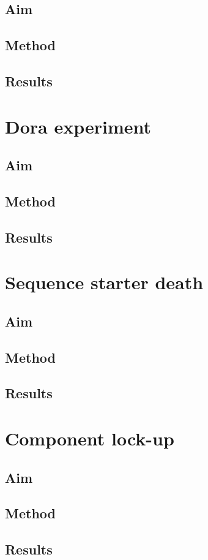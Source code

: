 \subsection{Aim}
\subsection{Method}
\subsection{Results}

\section{Dora experiment}
\subsection{Aim}
\subsection{Method}
\subsection{Results}

\section{Sequence starter death}
\subsection{Aim}
\subsection{Method}
\subsection{Results}

\section{Component lock-up}
\subsection{Aim}
\subsection{Method}
\subsection{Results}


